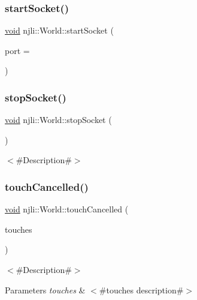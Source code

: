 \subsubsection{\texorpdfstring{start\+Socket()}{startSocket()}\hspace{0.1cm}{\footnotesize\ttfamily [2/2]}}
{\footnotesize\ttfamily \mbox{\hyperlink{_thread_8h_af1e856da2e658414cb2456cb6f7ebc66}{void}} njli\+::\+World\+::start\+Socket (\begin{DoxyParamCaption}\item[{\mbox{\hyperlink{_util_8h_a9e6c91d77e24643b888dbd1a1a590054}{u16}}}]{port = {} }\end{DoxyParamCaption})}

\mbox{\label{classnjli_1_1_world_a7d217f38577d72d349e2df64761dc4c5}} 
\subsubsection{\texorpdfstring{stop\+Socket()}{stopSocket()}}
{\footnotesize\ttfamily \mbox{\hyperlink{_thread_8h_af1e856da2e658414cb2456cb6f7ebc66}{void}} njli\+::\+World\+::stop\+Socket (\begin{DoxyParamCaption}{ }\end{DoxyParamCaption})}

$<$\#\+Description\#$>$ \mbox{\label{classnjli_1_1_world_a456be839bfe441022745d2790ac44942}} 
\subsubsection{\texorpdfstring{touch\+Cancelled()}{touchCancelled()}}
{\footnotesize\ttfamily \mbox{\hyperlink{_thread_8h_af1e856da2e658414cb2456cb6f7ebc66}{void}} njli\+::\+World\+::touch\+Cancelled (\begin{DoxyParamCaption}\item[{\mbox{\hyperlink{classnjli_1_1_device_touch}{Device\+Touch}} $\ast$$\ast$}]{touches }\end{DoxyParamCaption})}

$<$\#\+Description\#$>$


\begin{DoxyParams}{Parameters}
{\em touches} & $<$\#touches description\#$>$ \\
\hline
\end{DoxyParams}
\mbox{\label{classnjli_1_1_world_a027fc2766ebe49b79f974e7e808610f8}} 
